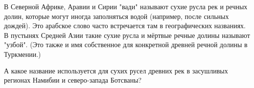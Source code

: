 
В Северной Африке, Аравии и Сирии "вади" называют сухие русла рек и речных долин, которые могут иногда заполняться водой (например, после сильных дождей). Это арабское слово часто встречается там в географических названиях. В пустынях Средней Азии такие сухие русла и мёртвые речные долины называют "узбой". (Это также и имя собственное для конкретной древней речной долины в Туркмении.)

А какое название используется для сухих русел древних рек в засушливых регионах Намибии и северо-запада Ботсваны?

